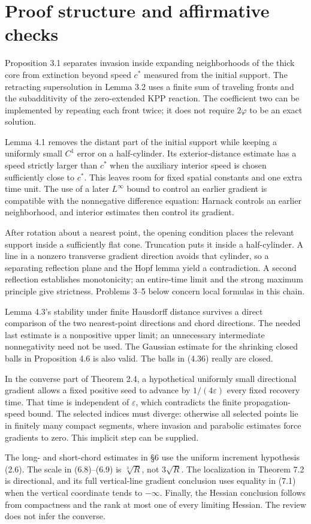 \documentclass[10pt]{article}
\begin{document}
\section*{Proof structure and affirmative checks}
Proposition 3.1 separates invasion inside expanding neighborhoods of the thick core from extinction beyond speed \(c^*\) measured from the initial support. The retracting supersolution in Lemma 3.2 uses a finite sum of traveling fronts and the subadditivity of the zero-extended KPP reaction. The coefficient two can be implemented by repeating each front twice; it does not require \(2\varphi\) to be an exact solution.\par
Lemma 4.1 removes the distant part of the initial support while keeping a uniformly small \(C^1\) error on a half-cylinder. Its exterior-distance estimate has a speed strictly larger than \(c^*\) when the auxiliary interior speed is chosen sufficiently close to \(c^*\). This leaves room for fixed spatial constants and one extra time unit. The use of a later \(L^\infty\) bound to control an earlier gradient is compatible with the nonnegative difference equation: Harnack controls an earlier neighborhood, and interior estimates then control its gradient.\par
After rotation about a nearest point, the opening condition places the relevant support inside a sufficiently flat cone. Truncation puts it inside a half-cylinder. A line in a nonzero transverse gradient direction avoids that cylinder, so a separating reflection plane and the Hopf lemma yield a contradiction. A second reflection establishes monotonicity; an entire-time limit and the strong maximum principle give strictness. Problems 3–5 below concern local formulas in this chain.\par
Lemma 4.3’s stability under finite Hausdorff distance survives a direct comparison of the two nearest-point directions and chord directions. The needed last estimate is a nonpositive upper limit; an unnecessary intermediate nonnegativity need not be used. The Gaussian estimate for the shrinking closed balls in Proposition 4.6 is also valid. The balls in (4.36) really are closed.\par
In the converse part of Theorem 2.4, a hypothetical uniformly small directional gradient allows a fixed positive seed to advance by \(1/(4\varepsilon)\) every fixed recovery time. That time is independent of \(\varepsilon\), which contradicts the finite propagation-speed bound. The selected indices must diverge: otherwise all selected points lie in finitely many compact segments, where invasion and parabolic estimates force gradients to zero. This implicit step can be supplied.\par
The long- and short-chord estimates in §6 use the uniform increment hypothesis (2.6). The scale in (6.8)–(6.9) is \(\sqrt[3]R\), not \(3\sqrt R\). The localization in Theorem 7.2 is directional, and its full vertical-line gradient conclusion uses equality in (7.1) when the vertical coordinate tends to \(-\infty\). Finally, the Hessian conclusion follows from compactness and the rank at most one of every limiting Hessian. The review does not infer the converse.\par
\end{document}

